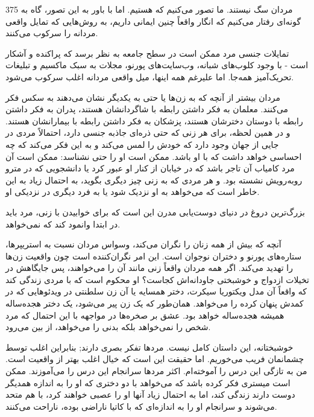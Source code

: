 375  
مردان سگ نیستند. ما تصور می‌کنیم که هستیم. اما با باور به این تصور، گاه به گونه‌ای رفتار می‌کنیم که انگار واقعاً چنین ایمانی داریم، به روش‌هایی که تمایل واقعی مردانه را سرکوب می‌کنند.

تمایلات جنسی مرد ممکن است در سطح جامعه به نظر برسد که پراکنده و آشکار است - با وجود کلوب‌های شبانه، وب‌سایت‌های پورنو، مجلات به سبک ماکسیم و تبلیغات تحریک‌آمیز همه‌جا. اما علیرغم همه اینها، میل واقعی مردانه اغلب سرکوب می‌شود.

مردان بیشتر از آنچه که به زن‌ها یا حتی به یکدیگر نشان می‌دهند به سکس فکر می‌کنند. معلمان به فکر داشتن رابطه با شاگردانشان هستند، پدران به فکر داشتن رابطه با دوستان دخترشان هستند، پزشکان به فکر داشتن رابطه با بیمارانشان هستند. و در همین لحظه، برای هر زنی که حتی ذره‌ای جاذبه جنسی دارد، احتمالاً مردی در جایی از جهان وجود دارد که خودش را لمس می‌کند و به این فکر می‌کند که چه احساسی خواهد داشت که با او باشد. ممکن است او را حتی نشناسد: ممکن است آن مرد کامیاب آن تاجر باشد که در خیابان از کنار او عبور کرد یا دانشجویی که در مترو روبه‌رویش نشسته بود. و هر مردی که به زنی چیز دیگری بگوید، به احتمال زیاد به این خاطر است که می‌خواهد به او نزدیک شود یا به فرد دیگری در نزدیکی او.

بزرگ‌ترین دروغ در دنیای دوست‌یابی مدرن این است که برای خوابیدن با زنی، مرد باید در ابتدا وانمود کند که نمی‌خواهد.

آنچه که بیش از همه زنان را نگران می‌کند، وسواس مردان نسبت به استریپرها، ستاره‌های پورنو و دختران نوجوان است. این امر نگران‌کننده است چون واقعیت زن‌ها را تهدید می‌کند. اگر همه مردان واقعاً زنی مانند آن را می‌خواهند، پس جایگاهش در تخیلات ازدواج و خوشبختی ‌جاودانه‌اش کجاست؟ او محکوم است که با مردی زندگی کند که واقعاً آن مدل ویکتوریا سیکرت، دختر همسایه یا آن زن سلطنتی در ویدئوهایی که در کمدش پنهان کرده را می‌خواهد. همان‌طور که یک زن پیر می‌شود، یک دختر هجده‌ساله همیشه هجده‌ساله خواهد بود. عشق بر صخره‌ها در مواجهه با این احتمال که مرد شخص را نمی‌خواهد بلکه بدنی را می‌خواهد، از بین می‌رود.

خوشبختانه، این داستان کامل نیست. مردها تفکر بصری دارند; بنابراین اغلب توسط چشمانمان فریب می‌خوریم. اما حقیقت این است که خیال اغلب بهتر از واقعیت است. من به تازگی این درس را آموخته‌ام. اکثر مردها سرانجام این درس را می‌آموزند. ممکن است میستری فکر کرده باشد که می‌خواهد با دو دختری که او را به اندازه همدیگر دوست دارند زندگی کند، اما به احتمال زیاد آنها او را عصبی خواهند کرد، با هم متحد می‌شوند و سرانجام او را به اندازه‌ای که با کاتیا ناراضی بوده، ناراحت می‌کنند.